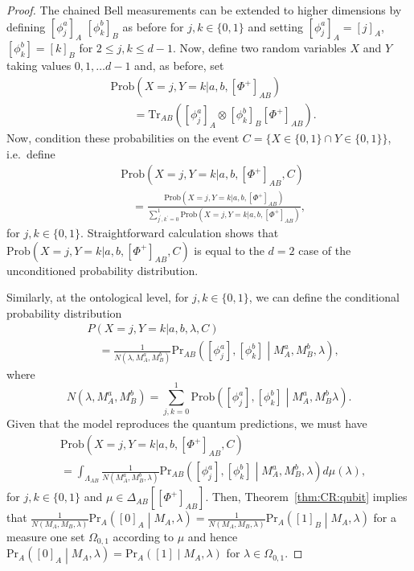 \documentclass[DIV=calc,paper=a4,fontsize=11pt,twocolumn]{scrartcl} %
\theoremstyle{definition}
\theoremstyle{plain}
\newcommand{\Proj}[1]{\ensuremath{\left [ #1 \right ]}}
\newcommand{\Tr}[2][]{\ensuremath{\text{Tr}_{#1} \left ( #2 \right )}}
\begin{document}
\begin{proof}
The chained Bell measurements can be extended to higher dimensions
by defining $\Proj{\phi^a_j}_A$ $\Proj{\phi^b_k}_B$ as before for
$j,k \in \{0,1\}$ and setting $\Proj{\phi^a_j}_A = \Proj{j}_A$,
$\Proj{\phi^b_k} = \Proj{k}_B$ for $2 \leq j,k \leq d-1$.  Now,
define two random variables $X$ and $Y$ taking values $0,1,\ldots
d-1$ and, as before, set
\begin{align}
&\text{Prob} \left (X = j, Y = k|a,b,\Proj{\Phi^+}_{AB} \right ) \nonumber\\
&\quad\quad=
\Tr[AB]{\Proj{\phi^a_j}_A \otimes \Proj{\phi^b_k}_B \Proj{\Phi^+}_{AB}}.
\end{align}
Now, condition these probabilities on the event $C = \{X \in \{0,1\}
\cap Y \in \{0,1\}\}$, i.e.\ define
\begin{align}
&\text{Prob} \left (X = j, Y = k|a,b,\Proj{\Phi^+}_{AB}, C \right )
\nonumber\\
&\quad= \frac{\text{Prob} \left (X = j, Y = k|a,b,\Proj{\Phi^+}_{AB}
\right )}{\sum_{j^{\prime},k^{\prime} = 0}^1 \text{Prob} \left
(X = j, Y = k|a,b,\Proj{\Phi^+}_{AB} \right )},
\end{align}
for $j,k \in \{0,1\}$.  Straightforward calculation shows that
$\text{Prob} \left (X = j, Y = k|a,b,\Proj{\Phi^+}_{AB}, C \right )$
is equal to the $d=2$ case of the unconditioned probability
distribution.

Similarly, at the ontological level, for $j,k \in \{0,1\}$, we can
define the conditional probability distribution
\begin{align}
&P(X=j,Y=k|a,b,\lambda,C) \nonumber\\
&\quad=
\frac{1}{N(\lambda,M_A^a,M_B^b)}\text{Pr}_{AB} \left ( \Proj{\phi^a_j} ,
\Proj{\phi^b_k} \middle | M_A^a,M_B^b, \lambda \right ),
\end{align}
where
\begin{equation}
N(\lambda,M_A^a,M_B^b) = \sum_{j,k = 0}^1
\text{Prob} \left ( \Proj{\phi^a_{j}}, \Proj{\phi^b_{k}} \middle |
M_A^a, M_B^b \lambda \right ).
\end{equation}
Given that the model reproduces the quantum predictions, we must
have
\begin{align}
&\text{Prob} \left (X = j, Y = k|a,b,\Proj{\Phi^+}_{AB}, C \right )
\nonumber\\
&= \int_{\Lambda_{AB}} \frac{1}{N(M_A^a,M_B^b,\lambda)}
\text{Pr}_{AB} \left ( \Proj{\phi^a_{j}} , \Proj{\phi^b_{k}} \middle
| M_A^a, M_B^b, \lambda \right ) d\mu(\lambda),
\end{align}
for $j,k \in \{0,1\}$ and $\mu \in \Delta_{AB} \left [
\Proj{\Phi^+}_{AB}\right ]$.  Then, Theorem~\ref{thm:CR:qubit}
implies that $\frac{1}{N(M_A,M_B,\lambda)}\text{Pr}_A \left (
\Proj{0}_A \middle | M_A, \lambda \right ) =
\frac{1}{N(M_A,M_B,\lambda)} \text{Pr}_A \left ( \Proj{1}_B \middle |
M_A, \lambda \right )$ for a measure one set $\Omega_{0,1}$
according to $\mu$ and hence $\text{Pr}_A \left ( \Proj{0}_A \middle |
M_A, \lambda \right ) = \text{Pr}_A \left ( \Proj{1} \middle | M_A,
\lambda \right )$ for $\lambda \in \Omega_{0,1}$.


\end{proof}
\end{document}
